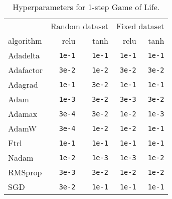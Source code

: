\documentclass[letterpaper]{article} %
\begin{document}
\vspace*{4in}

\begin{table}[h]
    \centering\small
    \begin{tabular}{lrrrr}
        \toprule
        & \multicolumn{2}{c}{Random dataset} & \multicolumn{2}{c}{Fixed dataset}
        \\\cmidrule(lr){2-3}\cmidrule(lr){4-5}
        algorithm & relu & tanh & relu & tanh
        \\\midrule
        Adadelta & \texttt{1e-1} & \texttt{1e-1} & \texttt{1e-1} & \texttt{1e-1}
        \\
        Adafactor & \texttt{3e-2} & \texttt{1e-2} & \texttt{3e-2} & \texttt{3e-2}
        \\
        Adagrad & \texttt{1e-1} & \texttt{3e-2} & \texttt{1e-1} & \texttt{1e-1}
        \\
        Adam & \texttt{1e-3} & \texttt{3e-2} & \texttt{3e-3} & \texttt{3e-2}
        \\
        Adamax & \texttt{3e-4} & \texttt{3e-2} & \texttt{1e-2} & \texttt{1e-3}
        \\
        AdamW & \texttt{3e-4} & \texttt{1e-2} & \texttt{1e-2} & \texttt{1e-1}
        \\
        Ftrl & \texttt{1e-1} & \texttt{1e-1} & \texttt{1e-1} & \texttt{1e-1}
        \\
        Nadam & \texttt{1e-2} & \texttt{1e-3} & \texttt{1e-3} & \texttt{1e-2}
        \\
        RMSprop & \texttt{3e-3} & \texttt{3e-2} & \texttt{1e-2} & \texttt{1e-2}
        \\
        SGD & \texttt{3e-2} & \texttt{1e-1} & \texttt{1e-1} & \texttt{1e-1}
        \\\bottomrule
    \end{tabular}
    \caption{Hyperparameters for 1-step Game of Life.}
    \label{tab:search_1_step}
\end{table}
\end{document}
